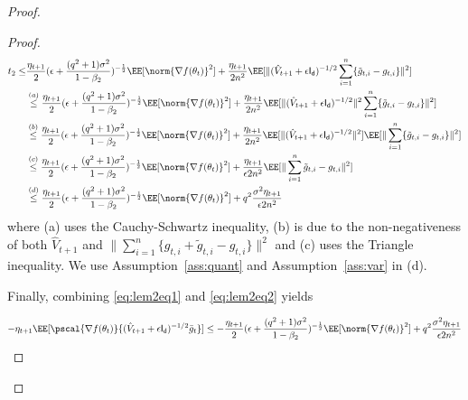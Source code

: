 \documentclass[11pt]{article}
\begin{document}
\begin{proof}
\begin{proof}
\begin{equation}\label{eq:lem2eq2}
\begin{split}
t_2 \leq &  \frac{\eta_{t+1}}{2} (\epsilon + \frac{(q^2+1)\sigma^2}{1 - \beta_2})^{-\frac{1}{2}} \EE[\norm{\nabla f(\theta_t)}^2] +\frac{\eta_{t+1}}{2n^2} \EE[\|(\hat{V}_{t+1} + \epsilon \mathsf{I_d})^{-1/2} \sum_{i=1}^n  \{ \tilde g_{t,i} - g_{t,i} \} \|^2]\\
& \overset{(a)}{\leq} \frac{\eta_{t+1}}{2} (\epsilon + \frac{(q^2+1)\sigma^2}{1 - \beta_2})^{-\frac{1}{2}} \EE[\norm{\nabla f(\theta_t)}^2] +\frac{\eta_{t+1}}{2n^2} \EE[\|(\hat{V}_{t+1} + \epsilon \mathsf{I_d})^{-1/2} \|^2 \sum_{i=1}^n  \{\tilde g_{t,i} - g_{t,i} \} \|^2]\\
& \overset{(b)}{\leq} \frac{\eta_{t+1}}{2} (\epsilon + \frac{(q^2+1)\sigma^2}{1 - \beta_2})^{-\frac{1}{2}} \EE[\norm{\nabla f(\theta_t)}^2] +\frac{\eta_{t+1}}{2n^2} \EE[\|(\hat{V}_{t+1} + \epsilon \mathsf{I_d})^{-1/2} \|^2] \EE[\| \sum_{i=1}^n  \{\tilde g_{t,i} - g_{t,i} \} \|^2]\\
& \overset{(c)}{\leq} \frac{\eta_{t+1}}{2} (\epsilon + \frac{(q^2+1)\sigma^2}{1 - \beta_2})^{-\frac{1}{2}} \EE[\norm{\nabla f(\theta_t)}^2] +\frac{\eta_{t+1}}{\epsilon 2n^2}  \EE[\| \sum_{i=1}^n \tilde g_{t,i} - g_{t,i} \|^2]\\
& \overset{(d)}{\leq} \frac{\eta_{t+1}}{2}(\epsilon + \frac{(q^2+1)\sigma^2}{1 - \beta_2})^{-\frac{1}{2}} \EE[\norm{\nabla f(\theta_t)}^2] +q^2\frac{\sigma^2 \eta_{t+1}}{\epsilon 2n^2}
\end{split}
\end{equation}
where (a) uses the Cauchy-Schwartz inequality, (b) is due to the non-negativeness of both $\hat{V}_{t+1}$ and $\| \sum_{i=1}^n  \{g_{t,i} + \tilde g_{t,i} - g_{t,i} \} \|^2$ and (c) uses the Triangle inequality.
We use Assumption~\ref{ass:quant} and Assumption~\ref{ass:var} in (d).

Finally, combining \eqref{eq:lem2eq1} and \eqref{eq:lem2eq2} yields

\begin{equation}
-\eta_{t+1}\EE[\pscal{\nabla f(\theta_t)}{(\hat{V}_{t+1} + \epsilon \mathsf{I_d})^{-1/2} \bar{g}_t}] \leq - \frac{\eta_{t+1}}{2}  (\epsilon + \frac{(q^2+1)\sigma^2}{1 - \beta_2})^{-\frac{1}{2}} \EE[\norm{\nabla f(\theta_t)}^2] +q^2 \frac{\sigma^2 \eta_{t+1}}{\epsilon 2n^2}
\end{equation}


\end{proof}




\end{proof}
\end{document}
